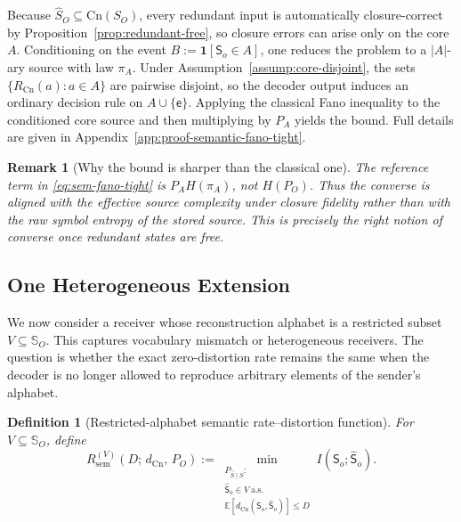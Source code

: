 \documentclass[journal,onecolumn]{IEEEtran}
\makeatletter
\newcommand{\Cn}{\text{Cn}}
\newcommand{\E}{\mathbb{E}}
\newtheorem{definition}{Definition}[section]
\newtheorem{remark}{Remark}[section]
\numberwithin{equation}{section}
\renewenvironment{proof}[1][\proofname]{\par
  \pushQED{\qed}%
  \normalfont \topsep6\p@\@plus6\p@\relax
  \trivlist
  \item[\hskip\labelsep
        \itshape
    #1\@addpunct{.}]\ignorespaces
}{%
  \popQED\endtrivlist\@endpefalse
}
\makeatother
\begin{document}
\begin{proof}[Proof sketch]
Because \(\hat S_O\subseteq\Cn(S_O)\), every redundant input is
automatically closure-correct by Proposition~\ref{prop:redundant-free},
so closure errors can arise only on the core \(A\).
Conditioning on the event \(B:=\mathbf{1}[{\mathsf{S}}_o\in A]\), one reduces the
problem to a \(|A|\)-ary source with law \(\pi_A\).
Under Assumption~\ref{assump:core-disjoint}, the sets
\(\{R_{\Cn}(a):a\in A\}\) are pairwise disjoint, so the decoder output
induces an ordinary decision rule on \(A\cup\{\mathsf e\}\).
Applying the classical Fano inequality to the conditioned core source
and then multiplying by \(P_A\) yields the bound.
Full details are given in
Appendix~\ref{app:proof-semantic-fano-tight}.
\end{proof}

\begin{remark}[Why the bound is sharper than the classical one]
\label{rem:fano-operational}
The reference term in
\eqref{eq:sem-fano-tight} is \(P_AH(\pi_A)\), not \(H(P_O)\).
Thus the converse is aligned with the effective source complexity
under closure fidelity rather than with the raw symbol entropy of
the stored source.
This is precisely the right notion of converse once redundant
states are free.
\end{remark}

\subsection{One Heterogeneous Extension}
\label{subsec:heterogeneous-extension}

We now consider a receiver whose reconstruction alphabet is a
restricted subset \(V\subseteq\mathbb{S}_O\).
This captures vocabulary mismatch or heterogeneous receivers.
The question is whether the exact zero-distortion rate remains the
same when the decoder is no longer allowed to reproduce arbitrary
elements of the sender's alphabet.

\begin{definition}[Restricted-alphabet semantic rate--distortion function]
\label{def:restricted-rd}
For \(V\subseteq\mathbb{S}_O\), define
\begin{equation}\label{eq:restricted-rd}
  R_{\mathrm{sem}}^{(V)}(D;\,d_{\Cn},\,P_O)
  :=
  \min_{\substack{P_{\hat S\mid S}:\\
  \hat {\mathsf{S}}_o\in V\ \text{a.s.}\\
  \E[d_{\Cn}({\mathsf{S}}_o,\hat {\mathsf{S}}_o)]\le D}}
  I(\mathsf{S}_o;\hat{\mathsf{S}}_o).
\end{equation}
\end{definition}
\end{document}
